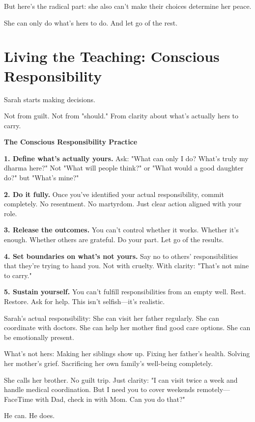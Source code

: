 \documentclass[11pt,twoside]{book}
\begin{document}
But here's the radical part: she also can't make their choices determine her peace.

She can only do what's hers to do. And let go of the rest.

\section*{Living the Teaching: Conscious Responsibility}

Sarah starts making decisions.

Not from guilt. Not from "should." From clarity about what's actually hers to carry.

\begin{practicebox}
\textbf{The Conscious Responsibility Practice}

\textbf{1. Define what's actually yours.} Ask: "What can only I do? What's truly my dharma here?" Not "What will people think?" or "What would a good daughter do?" but "What's mine?"

\textbf{2. Do it fully.} Once you've identified your actual responsibility, commit completely. No resentment. No martyrdom. Just clear action aligned with your role.

\textbf{3. Release the outcomes.} You can't control whether it works. Whether it's enough. Whether others are grateful. Do your part. Let go of the results.

\textbf{4. Set boundaries on what's not yours.} Say no to others' responsibilities that they're trying to hand you. Not with cruelty. With clarity: "That's not mine to carry."

\textbf{5. Sustain yourself.} You can't fulfill responsibilities from an empty well. Rest. Restore. Ask for help. This isn't selfish—it's realistic.
\end{practicebox}

Sarah's actual responsibility: She can visit her father regularly. She can coordinate with doctors. She can help her mother find good care options. She can be emotionally present.

What's not hers: Making her siblings show up. Fixing her father's health. Solving her mother's grief. Sacrificing her own family's well-being completely.

She calls her brother. No guilt trip. Just clarity: "I can visit twice a week and handle medical coordination. But I need you to cover weekends remotely—FaceTime with Dad, check in with Mom. Can you do that?"

He can. He does.
\end{document}
